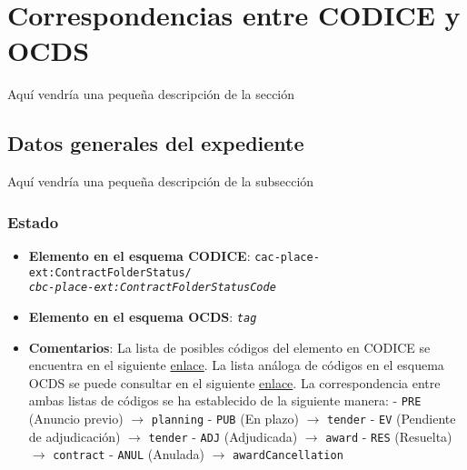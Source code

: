 \section{Correspondencias entre CODICE y OCDS}

    Aquí vendría una pequeña descripción de la sección

    \vspace{0.3cm}
    
    \subsection{Datos generales del expediente}
    
    Aquí vendría una pequeña descripción de la subsección
    
        \subsubsection{Estado}
            \begin{itemize}
                \item \textbf{Elemento en el esquema CODICE}:
                    \tabto{7.6cm} \texttt{cac-place-ext:ContractFolderStatus/} \\
                    \tabto{7.6cm} \texttt{\textit{cbc-place-ext:ContractFolderStatusCode}}
                \item \textbf{Elemento en el esquema OCDS}:
                    \tabto{7.6cm} \texttt{\textit{tag}}
                \item \textbf{Comentarios}: La lista de posibles códigos del elemento en CODICE se encuentra en el siguiente 
                    \href{https://contrataciondelestado.es/codice/cl/2.04/SyndicationContractFolderStatusCode-2.04.gc}{enlace}.
                    La lista análoga de códigos en el esquema OCDS se puede consultar en el siguiente
                    \href{https://standard.open-contracting.org/latest/es/schema/codelists/#release-tag}{enlace}.
                    La correspondencia entre ambas listas de códigos se ha establecido de la siguiente manera:
                        \subitem - \texttt{PRE} (Anuncio previo) $\rightarrow$ \texttt{planning}
                        \subitem - \texttt{PUB} (En plazo) $\rightarrow$ \texttt{tender}
                        \subitem - \texttt{EV} (Pendiente de adjudicación) $\rightarrow$ \texttt{tender}
                        \subitem - \texttt{ADJ} (Adjudicada) $\rightarrow$ \texttt{award}
                        \subitem - \texttt{RES} (Resuelta) $\rightarrow$ \texttt{contract}
                        \subitem - \texttt{ANUL} (Anulada) $\rightarrow$ \texttt{awardCancellation}
            \end{itemize}
        
